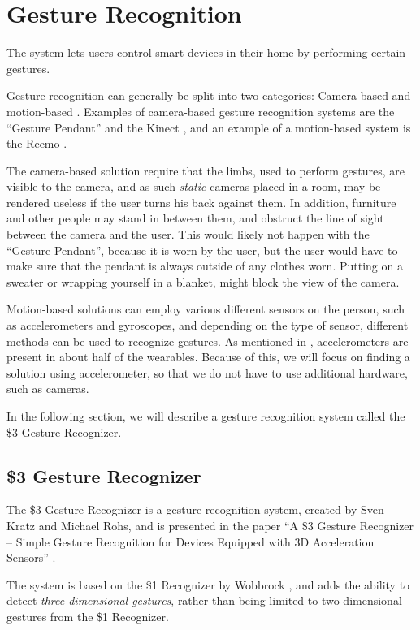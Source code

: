 \section{Gesture Recognition}\label{sec:gesturerecognition}
The system lets users control smart devices in their home by performing certain gestures.

Gesture recognition can generally be split into two categories: 
Camera-based and motion-based \cite{Kela2006}. 
Examples of camera-based gesture recognition systems are the ``Gesture Pendant'' \cite{starner2000gesture} and the Kinect \cite{kinect}, 
and an example of a motion-based system is the Reemo \cite{Reemo}.

The camera-based solution require that the limbs, 
used to perform gestures, 
are visible to the camera, 
and as such \emph{static} cameras placed in a room, 
may be rendered useless if the user turns his back against them. 
In addition, furniture and other people may stand in between them, 
and obstruct the line of sight between the camera and the user.
This would likely not happen with the ``Gesture Pendant'',
because it is worn by the user, 
but the user would have to make sure that the pendant is always outside of any clothes worn.
Putting on a sweater or wrapping yourself in a blanket, 
might block the view of the camera.

Motion-based solutions can employ various different sensors on the person,
such as accelerometers and gyroscopes, 
and depending on the type of sensor, 
different methods can be used to recognize gestures.
As mentioned in , accelerometers are present in about half of the wearables. 
Because of this, we will focus on finding a solution using accelerometer, 
so that we do not have to use additional hardware, such as cameras. 

In the following section, we will describe a gesture recognition system called the \$3 Gesture Recognizer. 

\subsection{\$3 Gesture Recognizer}\label{sec:threedollar}
The \$3 Gesture Recognizer is a gesture recognition system, 
created by Sven Kratz and Michael Rohs, 
and is presented in the paper ``A \$3 Gesture Recognizer – Simple Gesture Recognition for Devices Equipped with 3D Acceleration Sensors'' \cite{threedollar}.

The system is based on the \$1 Recognizer by Wobbrock \etal \cite{wobbrock2007gestures}, 
and adds the ability to detect \emph{three dimensional gestures}, 
rather than being limited to two dimensional gestures from the \$1 Recognizer.

